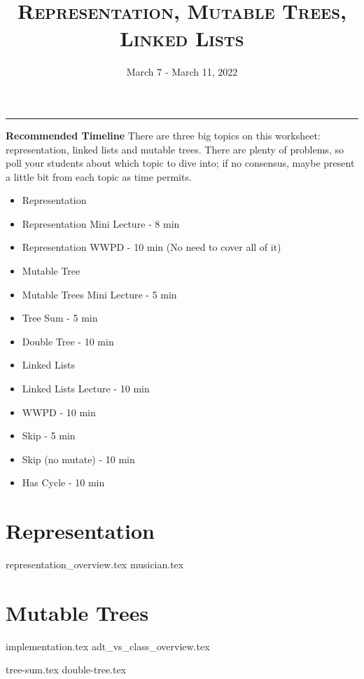 \documentclass{exam}
\title{\textsc{Representation, Mutable Trees, Linked Lists}}
\date{March 7 - March 11, 2022}
\begin{document}
\maketitle
\rule{\textwidth}{0.15em}
\fontsize{12}{15}\selectfont

\begin{guide}
\textbf{Recommended Timeline}
\newline
There are three big topics on this worksheet: representation, linked lists and mutable trees. There are plenty of problems,
so poll your students about which topic to dive into; if no consensus, maybe present a little bit from each topic as time permits.
    \begin{itemize}
        \item Representation
            \item Representation Mini Lecture - 8 min
            \item Representation WWPD - 10 min (No need to cover all of it)
        \item Mutable Tree
            \item Mutable Trees Mini Lecture - 5 min
            \item Tree Sum - 5 min
            \item Double Tree - 10 min
        \item Linked Lists
            \item Linked Lists Lecture - 10 min
            \item WWPD - 10 min
            \item Skip - 5 min
            \item Skip (no mutate) - 10 min
            \item Has Cycle - 10 min
    \end{itemize}
\vspace{.5cm}
\end{guide}

\section{Representation}
\begin{questions}
{representation_overview.tex}
{musician.tex}
\end{questions}

\newpage
\section{Mutable Trees}
{implementation.tex}
{adt_vs_class_overview.tex}
\vspace{\baselineskip}
\begin{questions}
{tree-sum.tex}
\newpage
{double-tree.tex}
\end{questions}
\end{document}
